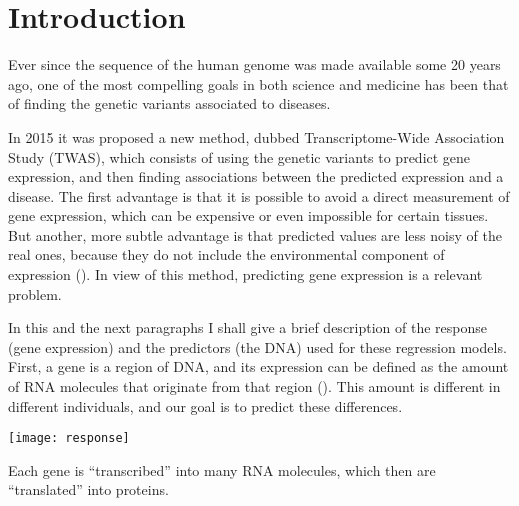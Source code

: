 \section{Introduction}

Ever since the sequence of the human genome was made available some 20 
years ago,  one of 
the most compelling goals in both science and medicine has been that of 
finding the genetic variants associated to diseases.


In 2015 it was proposed a new method, 
 dubbed Transcriptome-Wide 
Association Study (TWAS), which consists of using the genetic variants 
to predict gene expression, and then finding associations between the 
predicted expression and a disease. The first advantage is that it is 
possible to avoid a direct measurement of gene expression, which can be 
expensive or even impossible for certain tissues. But another, more 
subtle advantage is that predicted values are less noisy of the real 
ones, because they do not include the environmental component of 
expression (). In view of this method, predicting gene 
expression is a relevant problem.

In this and the next paragraphs I shall give a brief description of the 
response (gene expression) and the predictors (the DNA) used for these 
regression models. First, a gene is a region of DNA, and its expression 
can be defined as the amount of RNA molecules that originate from that 
region (). This amount is different in different 
individuals, and our goal is to predict these differences.

\begin{marginfigure}[-4.1cm]
  \texttt{[image: response]}
  \caption{Each gene is \enquote{transcribed} into many RNA molecules, 
which then are \enquote{translated} into proteins.}
\end{marginfigure}

